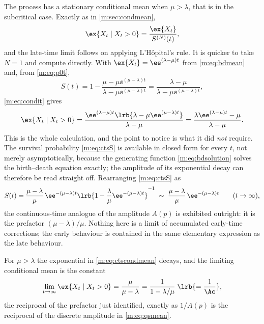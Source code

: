 The process has a stationary conditional mean when $\mu>\lambda$, that is in the
subcritical case. Exactly as in \cref{m:sec:condmean},
\begin{equation}
\label{m:eq:condit}
\ex{X_t\mid X_t>0} = \frac{\ex{X_t}}{S^{(N)}(t)},
\end{equation}
and the late-time limit follows on applying L'Hôpital's rule. It is quicker to take
$N=1$ and compute directly. With $\ex{X_t}=\ee^{(\lambda-\mu)t}$ from
\cref{m:eq:bdmean} and, from \cref{m:eq:p0t},
\begin{equation}
\label{m:eq:ctsS}
S(t) = 1-\frac{\mu-\mu\ee^{(\mu-\lambda)t}}{\lambda-\mu\ee^{(\mu-\lambda)t}}
= \frac{\lambda-\mu}{\lambda-\mu\ee^{(\mu-\lambda)t}},
\end{equation}
\cref{m:eq:condit} gives
\begin{equation}
\label{m:eq:ctscondmean}
\ex{X_t\mid X_t>0}
= \frac{\ee^{(\lambda-\mu)t}\lrb{\lambda-\mu\ee^{(\mu-\lambda)t}}}{\lambda-\mu}
= \frac{\lambda\ee^{(\lambda-\mu)t}-\mu}{\lambda-\mu} .
\end{equation}
This is the whole calculation, and the point to notice is what it did \emph{not}
require. The survival probability \cref{m:eq:ctsS} is available in closed form for
every $t$, not merely asymptotically, because the generating function
\cref{m:eq:bdsolution} solves the birth--death equation exactly; the amplitude of
its exponential decay can therefore be read straight off. Rearranging
\cref{m:eq:ctsS} as
\begin{equation*}
S(t) = \frac{\mu-\lambda}{\mu}\,\ee^{-(\mu-\lambda)t}
\lrb{1-\frac{\lambda}{\mu}\ee^{-(\mu-\lambda)t}}^{-1}
\;\sim\;\frac{\mu-\lambda}{\mu}\,\ee^{-(\mu-\lambda)t}
\qquad(t\to\infty),
\end{equation*}
the continuous-time analogue of the amplitude $A(p)$ is exhibited outright: it is
the prefactor $(\mu-\lambda)/\mu$. Nothing here is a limit of accumulated
early-time corrections; the early behaviour is contained in the same elementary
expression as the late behaviour.

For $\mu>\lambda$ the exponential in \cref{m:eq:ctscondmean} decays, and the limiting
conditional mean is the constant
\begin{equation}
\label{m:eq:ctsqsmean}
\lim_{t\to\infty}\ex{X_t\mid X_t>0} = \frac{\mu}{\mu-\lambda}
= \frac{1}{1-\lambda/\mu}
\;\lrb{=\frac{1}{\Ac}} ,
\end{equation}
the reciprocal of the prefactor just identified, exactly as $1/A(p)$ is the
reciprocal of the discrete amplitude in \cref{m:eq:qsmean}.

